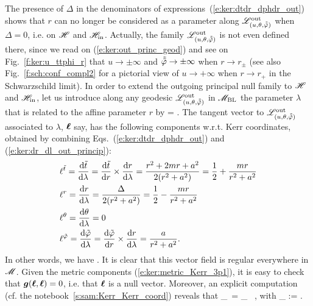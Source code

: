 The presence of $\Delta$ in the denominators of expressions~(\ref{e:ker:dtdr_dphdr_out})
shows that $r$ can no longer be considered as
a parameter along $\mathscr{L}^{\rm out}_{(u,\theta,\tilde{{\tilde\varphi}})}$ when
$\Delta=0$, i.e. on $\mathscr{H}$ and $\mathscr{H}_{\rm in}$. Actually, the family $\mathscr{L}^{\rm out}_{(u,\theta,\tilde{{\tilde\varphi}})}$ is not even defined there, since we read on
(\ref{e:ker:out_princ_geod}) and see on Fig.~\ref{f:ker:u_ttphi_r} that
$u\to\pm\infty$ and $\tilde{{\tilde\varphi}}\to \pm\infty$ when $r\to r_\pm$ (see also
Fig.~\ref{f:sch:conf_compl2} for a pictorial view of $u\to+\infty$ when $r\to r_+$ in the Schwarzschild limit).
In order to extend the outgoing principal null family to $\mathscr{H}$ and $\mathscr{H}_{\rm in}$,
let us introduce
along any geodesic $\mathscr{L}^{\rm out}_{(u,\theta,\tilde{{\tilde\varphi}})}$ in $\mathscr{M}_{\rm BL}$ the parameter $\lambda$
that is related to the affine parameter $r$ by
\be \label{e:ker:dr_dl_out_princip}
     =  .
\ee
The tangent vector to $\mathscr{L}^{\rm out}_{(u,\theta,\tilde{{\tilde\varphi}})}$ associated
to $\lambda$, $\bm{\ell}$ say, has the following components w.r.t. Kerr coordinates, obtained
by combining Eqs.~(\ref{e:ker:dtdr_dphdr_out}) and (\ref{e:ker:dr_dl_out_princip}):
\begin{align}
& \ell^{{\tilde t}} = \frac{\mathrm{d} {\tilde t}}{\mathrm{d}\lambda} = \frac{\mathrm{d} {\tilde t}}{\mathrm{d} r}\times\frac{\mathrm{d} r}{\mathrm{d}\lambda}
    = \frac{r^2 + 2m r + a^2}{2(r^2+a^2)} = \frac{1}{2} + \frac{m r}{r^2 + a^2} \nonumber \\
& \ell^{r} = \frac{\mathrm{d} r}{\mathrm{d}\lambda} = \frac{\Delta}{2(r^2+a^2)} = \frac{1}{2} - \frac{m r}{r^2 + a^2}\nonumber \\
& \ell^{\theta} = \frac{\mathrm{d} \theta}{\mathrm{d}\lambda} = 0 \nonumber\\
& \ell^{{\tilde\varphi}} = \frac{\mathrm{d} {\tilde\varphi}}{\mathrm{d}\lambda} = \frac{\mathrm{d} {\tilde\varphi}}{\mathrm{d} r}\times\frac{\mathrm{d} r}{\mathrm{d}\lambda}
    = \frac{a}{r^2+a^2} . \nonumber
\end{align}
In other words, we have
\be \label{e:ker:def_ell_outgoing}
     .
\ee
It is clear that this vector field is regular everywhere in $\mathscr{M}$.
Given the metric components (\ref{e:ker:metric_Kerr_3p1}), it is easy
to check that $\bm{g}(\bm{\ell},\bm{\ell})=0$, i.e. that $\bm{\ell}$ is a null vector.
Moreover, an explicit computation (cf. the notebook~\ref{s:sam:Kerr_Kerr_coord}) reveals that
\be \label{e:ker:pregeod_ell}
    \wnab_{\wl}\, \wl = \kappa_{\wl} \, \wl,
    \quad\mbox{with}\quad
    \kappa_{\wl} :=  .

